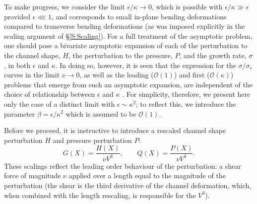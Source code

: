 \documentclass{jfm}
\newcommand{\order}[1]{\mathcal{O}\left(#1\right)}
\begin{document}
To make progress, we consider the limit $\epsilon / \kappa \to 0$, which is possible with $\epsilon/\kappa \gg \epsilon$ provided $\epsilon \lll 1$, and corresponds to small in-plane bending deformations compared to transverse bending deformations (as was imposed explicitly in the scaling argument of \S\ref{S:Scaling}). For a full treatment of the asymptotic problem, one should pose a bivariate asymptotic expansion of each of the perturbation to the channel shape, $H$, the perturbation to the pressure,
$P$, and the growth rate, $\sigma$, in both $\epsilon$ and $\kappa$. In doing so, however, it is seen that the expression for the $\sigma/\sigma_c$ curves in the limit $\nu \to 0$, as well as the leading ($\order{1}$) and first ($\order{\kappa}$) problems that emerge from such an asymptotic expansion, are independent of the choice of relationship between $\epsilon$ and $\kappa$ \cite[see][which contains a complete treatment of this problem]{BradleyPhDthesis}. For simplicity, therefore, we present here only the case of a distinct limit with $\epsilon \sim \kappa^2$; to reflect this, we introduce the parameter $\beta = \epsilon/\kappa^2$ which is assumed to be $\order{1}$.

Before we proceed, it is instructive to introduce a rescaled channel shape perturbation $H$ and pressure perturbation $P$:
\begin{equation}\label{E:Asymptotics:Rescaling}
G(X) = \frac{H(X)}{\nu V^3}, \qquad Q(X) = \frac{P(X)}{\nu V^3}.
\end{equation}
These scalings reflect the leading order behaviour of the perturbation: a shear force of magnitude $\nu$ applied over a length equal to  the magnitude  of  the  perturbation  (the  shear  is  the  third  derivative  of  the  channel deformation, which, when combined with the length rescaling, is responsible for the $V^3$). 
\end{document}
